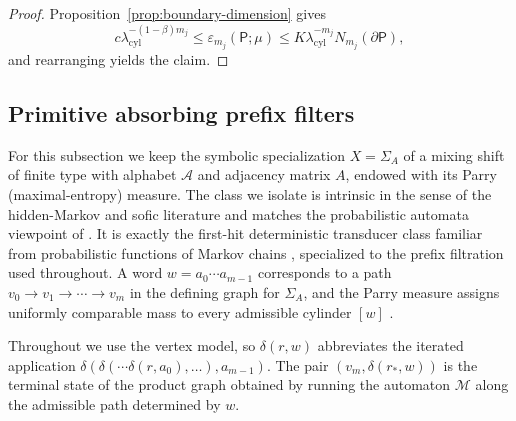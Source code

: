 \begin{proof}
Proposition~\ref{prop:boundary-dimension} gives
\[
c\lambda_{\mathrm{cyl}}^{-(1-\beta)m_j}
\le \varepsilon_{m_j}(\mathsf{P};\mu)
\le K\lambda_{\mathrm{cyl}}^{-m_j}N_{m_j}(\partial\mathsf{P}),
\]
and rearranging yields the claim.
\end{proof}

\subsection{Primitive absorbing prefix filters}

For this subsection we keep the symbolic specialization
$X=\Sigma_A$ of a mixing shift of finite type with alphabet $\mathcal{A}$ and
adjacency matrix $A$, endowed with its Parry (maximal-entropy) measure.  The
class we isolate is intrinsic in the sense of the hidden-Markov and sofic
literature \cite{BoylePetersenHMP,PollicottKempton2016,Verbitskiy2011} and
matches the probabilistic automata viewpoint of
\cite{Rabin1963,Paz1971}.  It is exactly the first-hit deterministic transducer
class familiar from probabilistic functions of Markov chains
\cite{Blackwell1957,Heller1965,BaumPetrie1966}, specialized to the prefix
filtration used throughout.  A word $w=a_0\cdots a_{m-1}$ corresponds to a path
$v_0\to v_1\to\cdots\to v_m$ in the defining graph for $\Sigma_A$, and the
Parry measure assigns uniformly comparable mass to every admissible cylinder
$[w]$ \cite{Parry1964}.

Throughout we use the vertex model, so $\delta(r,w)$ abbreviates the iterated
application $\delta(\delta(\cdots\delta(r,a_0),\ldots),a_{m-1})$.  The pair
$(v_m,\delta(r_\ast,w))$ is the terminal state of the product graph obtained by
running the automaton $\mathcal{M}$ along the admissible path determined by
$w$.

